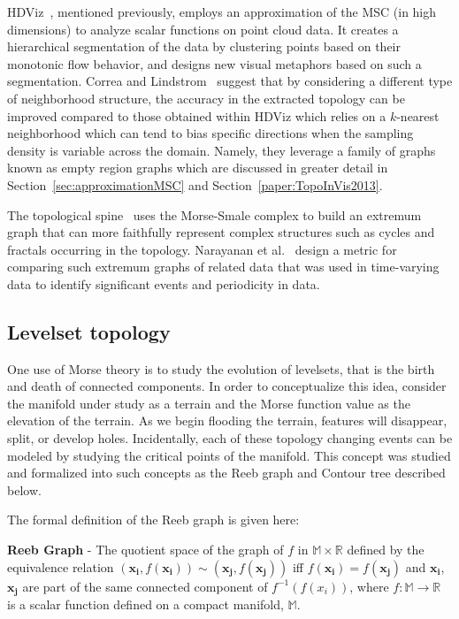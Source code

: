 HDViz~\cite{GerberBremerPascucci2010}, mentioned previously, employs an approximation of the MSC (in high dimensions) to analyze scalar functions on point cloud data.
%
It creates a hierarchical segmentation of the data by clustering points based on their monotonic flow behavior, and designs new visual metaphors based on such a segmentation.
%
Correa and Lindstrom~\cite{CorreaLindstrom2011} suggest that by considering a different type of neighborhood structure, the accuracy in the extracted topology can be improved compared to those obtained within HDViz which relies on a $k$-nearest neighborhood which can tend to bias specific directions when the sampling density is variable across the domain.
%
Namely, they leverage a family of graphs known as empty region graphs which are discussed in greater detail in Section~\ref{sec:approximationMSC} and Section~\ref{paper:TopoInVis2013}.
%

The topological spine~\cite{CorreaLindstromBremer2011} uses the Morse-Smale complex to build an extremum graph that can more faithfully represent complex structures such as cycles and fractals occurring in the topology.
%
Narayanan et al.~\cite{NarayananThomasNatarajan2015} design a metric for comparing such extremum graphs of related data that was used in time-varying data to identify significant events and periodicity in data.

\subsection{Levelset topology}

One use of Morse theory is to study the evolution of levelsets, that is the birth and death of connected components.
%
In order to conceptualize this idea, consider the manifold under study as a terrain and the Morse function value as the elevation of the terrain.
%
As we begin flooding the terrain, features will disappear, split, or develop holes.
%
Incidentally, each of these topology changing events can be modeled by studying the critical points of the manifold.
%
This concept was studied and formalized into such concepts as the Reeb graph and Contour tree described below.

The formal definition of the Reeb graph is given here:

\begin{defn}
\textbf{Reeb Graph} - The quotient space of the graph of $f$ in
$\mathbb{M} \times \mathbb{R}$ defined by the equivalence relation
$(\mathbf{x_i},f(\mathbf{x_i})) \sim (\mathbf{x_j},f(\mathbf{x_j}))$ iff
$f(\mathbf{x_i}) = f(\mathbf{x_j})$ and $\mathbf{x_i}$,$\mathbf{x_j}$ are part
of the same connected component of $f^{-1}(f(x_i))$, where $f : \mathbb{M} \rightarrow \mathbb{R}$ is a scalar function defined on a compact manifold, $\mathbb{M}$.
\end{defn}

